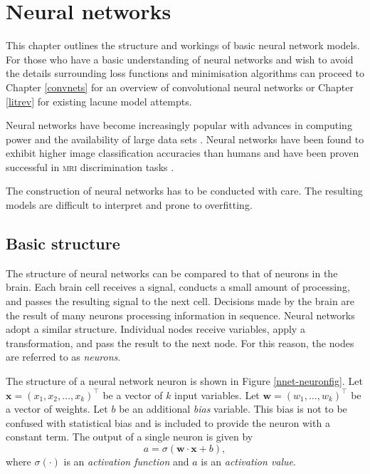 %
%

\chapter{Neural networks}\label{neuralNets-intro}

This chapter outlines the structure and workings of basic neural network models. For those who have a basic understanding of neural networks and wish to avoid the details surrounding loss functions and minimisation algorithms can proceed to Chapter \ref{convnets} for an overview of convolutional neural networks or Chapter \ref{litrev} for existing lacune model attempts.

% 
% 

Neural networks have become increasingly popular with advances in computing power and the availability of large data sets \cite{Goodfellow-et-al-2016}. Neural networks have been found to exhibit higher image classification accuracies than humans \cite{HeK2016Drlf} and have been proven successful in \textsc{mri} discrimination tasks \cite{DouQ.2016ADoC,Yokoyama2007}.

The construction of neural networks has to be conducted with care. The resulting models are difficult to interpret and prone to overfitting. 

\section{Basic structure}\label{nnets-structure}

The structure of neural networks can be compared to that of neurons in the brain. Each brain cell receives a signal, conducts a small amount of processing, and passes the resulting signal to the next cell. Decisions made by the brain are the result of many neurons processing information in sequence. Neural networks adopt a similar structure. Individual nodes receive variables, apply a transformation, and pass the result to the next node. For this reason, the nodes are referred to as \textit{neurons}.

The structure of a neural network neuron is shown in Figure \ref{nnet-neuronfig}. Let $\mathbf{x} = (x_1, x_2, \ldots, x_k)^\intercal$ be a vector of $k$ input variables. Let $\mathbf{w} = (w_1, \ldots, w_k)^\intercal$ be a vector of weights. Let $b$ be an additional \textit{bias} variable. This bias is not to be confused with statistical bias and is included to provide the neuron with a constant term. The output of a single neuron is given by
\[
	a = \sigma(\mathbf{w}\cdot\mathbf{x} + b),
\]
where $\sigma(\cdot)$ is an \textit{activation function} and $a$ is an \textit{activation value}.

